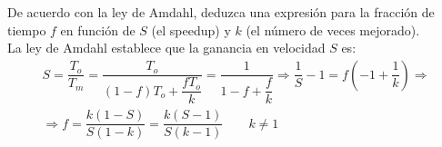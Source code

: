 \begin{ejercicio}\label{ej:1_5}
De acuerdo con la ley de Amdahl, deduzca una expresión para la fracción de tiempo $f$ en función de $S$ (el speedup) y $k$ (el número de veces mejorado).\\

La ley de Amdahl establece que la ganancia en velocidad $S$ es:
\begin{multline*}
    S = \dfrac{T_o}{T_m} = \dfrac{T_o}{(1-f)T_o + \dfrac{fT_o}{k}} = \dfrac{1}{1-f + \dfrac{f}{k}}
    \Longrightarrow \dfrac{1}{S}-1=f\left(-1+\dfrac{1}{k}\right)
    \Longrightarrow \\ \Longrightarrow
    f = \dfrac{k(1-S)}{S(1-k)} = \dfrac{k(S-1)}{S(k-1)}\qquad k\neq 1
\end{multline*}
\end{ejercicio}

